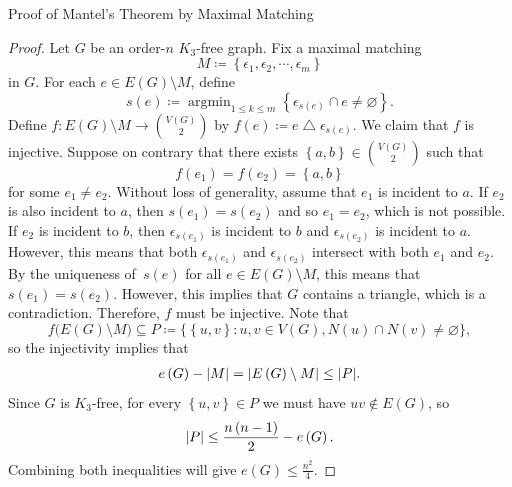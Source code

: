 \documentclass[math]{amznotes}
\theoremstyle{remark}
\DeclareMathOperator*{\argmin}{argmin}
\DeclareMathOperator*{\xor}{\triangle}
\begin{document}
\begin{genbox}{Proof of Mantel's Theorem by Maximal Matching}
    \begin{proof}
        Let $G$ be an order-$n$ $K_3$-free graph. Fix a maximal matching 
        \begin{equation*}
            M \coloneqq \left\{\epsilon_1, \epsilon_2, \cdots, \epsilon_m\right\}
        \end{equation*}
        in $G$. For each $e \in E\left(G\right) \setminus M$, define 
        \begin{equation*}
            s\left(e\right) \coloneqq \argmin_{1 \leq k \leq m}\left\{\epsilon_{s\left(e\right)} \cap e \neq \varnothing\right\}.
        \end{equation*}
        Define $f \colon E\left(G\right) \setminus M \to \binom{V\left(G\right)}{2}$ by $f\left(e\right) \coloneqq e \xor \epsilon_{s\left(e\right)}$. We claim that $f$ is injective. Suppose on contrary that there exists $\left\{a, b\right\} \in \binom{V\left(G\right)}{2}$ such that 
        \begin{equation*}
            f\left(e_1\right) = f\left(e_2\right) = \left\{a, b\right\}
        \end{equation*}
        for some $e_1 \neq e_2$. Without loss of generality, assume that $e_1$ is incident to $a$. If $e_2$ is also incident to $a$, then $s\left(e_1\right) = s\left(e_2\right)$ and so $e_1 = e_2$, which is not possible. If $e_2$ is incident to $b$, then $\epsilon_{s\left(e_1\right)}$ is incident to $b$ and $\epsilon_{s\left(e_2\right)}$ is incident to $a$. However, this means that both $\epsilon_{s\left(e_1\right)}$ and $\epsilon_{s\left(e_2\right)}$ intersect with both $e_1$ and $e_2$. By the uniqueness of~$s\left(e\right)$ for all $e \in E\left(G\right) \setminus M$, this means that $s\left(e_1\right) = s\left(e_2\right)$. However, this implies that $G$ contains a triangle, which is a contradiction. Therefore, $f$ must be injective. Note that 
        \begin{equation*}
            f\bigl(E\left(G\right) \setminus M\bigr) \subseteq P \coloneqq \bigl\{\left\{u, v\right\} \colon u, v \in V\left(G\right), N\left(u\right) \cap N\left(v\right) \neq \varnothing\bigr\},
        \end{equation*}
        so the injectivity implies that 
        \begin{align*}
            e\left(G\right) - {\left\lvert {M} \right\rvert} = {\left\lvert {E\left(G\right) \setminus M} \right\rvert} \leq {\left\lvert {P} \right\rvert}.
        \end{align*}
        Since $G$ is $K_3$-free, for every $\left\{u, v\right\} \in P$ we must have $uv \notin E\left(G\right)$, so 
        \begin{equation*}
            {\left\lvert {P} \right\rvert} \leq \frac{n\left(n - 1\right)}{2} - e\left(G\right).
        \end{equation*}
        Combining both inequalities will give $e\left(G\right) \leq \frac{n^2}{4}$.
    \end{proof}
\end{genbox}
\end{document}
